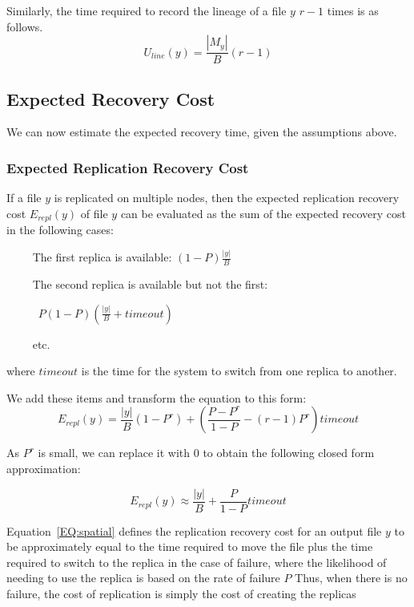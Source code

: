 \documentclass{sig-alternate}
\begin{document}
Similarly, the time required to record the lineage of a file $y$ $r-1$ times is as follows.
\begin{equation}
U_{line}(y) = \frac{|M_{y}|}{B} (r-1)
\end{equation}

\subsection{Expected Recovery Cost}

We can now estimate the expected recovery time, given the assumptions above.

\subsubsection{Expected Replication Recovery Cost}
If a file $y$ is replicated on multiple nodes,
then the expected replication recovery cost $E_{repl}(y)$ of file $y$ can be evaluated as the sum
of the expected recovery cost in the following cases:

\noindent ~~~~ The first replica is available: $(1-P)\frac{|y|}{B}$

\noindent ~~~~ The second replica is available but not the first:\\

\vspace{-2ex}

~~~~~ $P(1-P)\left(\frac{|y|}{B}+timeout\right)$

\noindent ~~~~ etc.

\noindent where $timeout$ is the time for the system to switch from one replica to another.

We add these items and transform the equation to this form:
\begin{equation}
E_{repl}(y) = \frac{|y|}{B}\left(1-P^r\right) + \left(\frac{P-P^r}{1-P}-(r-1)P^r\right)timeout
\end{equation}

As $P^r$ is small, we can replace it with $0$ to obtain the following closed form approximation:

\begin{equation}
E_{repl}(y) \approx \frac{|y|}{B}+\frac{P}{1-P}timeout
\label{EQ:spatial}
\end{equation}

Equation~\ref{EQ:spatial} defines the replication recovery cost for an output file $y$ to be approximately 
equal to the time required to move the file plus the time required to switch to the replica
in the case of failure, where the likelihood of needing to use the replica is based on the rate of failure $P$
Thus, when there is no failure, the cost of replication is simply the cost of creating the replicas
\end{document}
